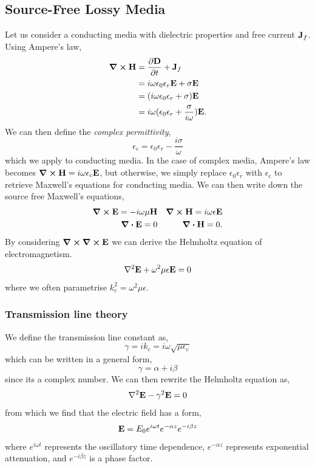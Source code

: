 \documentclass{book}
\begin{document}
\subsection{Source-Free Lossy Media}
Let us consider a conducting media with dielectric properties and free current $\vb{J}_f$. Using Ampere's law,
\begin{equation}
	\begin{split}
		\curl{\vb{H}} & = \pdv{\vb{D}}{t} + \vb{J}_f \\
		& = i \omega \epsilon_0\epsilon_r \vb{E} + \sigma \vb{E} \\
		& = (i\omega \epsilon_0\epsilon_r + \sigma)\vb{E} \\
		& = i\omega(\epsilon_0\epsilon_r + \frac{\sigma}{i\omega})\vb{E}.
	\end{split}
\end{equation}
We can then define the \textit{complex permittivity},
\begin{equation}
	\epsilon_c = \epsilon_0\epsilon_r - \frac{i\sigma}{\omega}
\end{equation}
which we apply to conducting media. In the case of complex media, Ampere's law becomes $\curl{\vb{H}} = i\omega\epsilon_c\vb{E}$, but otherwise, we simply replace $\epsilon_0\epsilon_r$ with $\epsilon_c$ to retrieve Maxwell's equations for conducting media. We can then write down the source free Maxwell's equations,
\begin{align}
	\curl{\vb{E}} = -i\omega \mu \vb{H} && \curl{\vb{H}} = i\omega \epsilon\vb{E} \\
	\div{\vb{E}} = 0  && \div{\vb{H}} = 0.
\end{align}
By considering $\curl{\curl{\vb{E}}}$ we can derive the Helmholtz equation of electromagnetism.
\begin{equation}
	\laplacian{\vb{E}} + \omega^2\mu \epsilon \vb{E} = 0
\end{equation}
where we often parametrise $k_c^2 = \omega^2\mu\epsilon$.
\subsubsection{Transmission line theory}
We define the transmission line constant as,
\begin{equation}
	\gamma = ik_c = i\omega\sqrt{\mu\epsilon_c}
\end{equation}
which can be written in a general form,
\begin{equation}
	\gamma = \alpha + i \beta
\end{equation}
since its a complex number. We can then rewrite the Helmholtz equation as,
\begin{equation}
	\laplacian \vb{E} - \gamma^2 \vb{E} = 0
\end{equation}
from which we find that the electric field has a form,
\begin{equation}
	\vb{E} = E_0e^{i\omega t}e^{-\alpha z} e^{-i\beta z}
\end{equation}
where $e^{i\omega t}$ represents the oscillatory time dependence, $e^{-\alpha z}$ represents exponential attenuation, and $e^{-i\beta z}$ is a phase factor.
\end{document}

